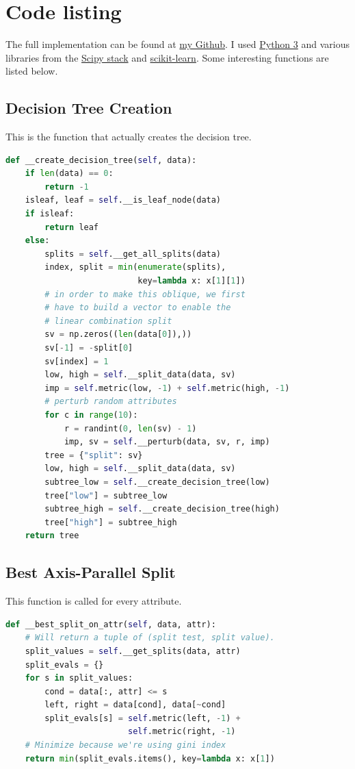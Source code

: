 \documentclass[12pt]{article}
\begin{document}
\appendix
\section{Code listing} \label{app:code}
The full implementation can be found at \href{http://github.com/KDercksen/pyblique}{my Github}. I used \href{http://www.python.org}{Python 3} and various libraries from the \href{http://www.scipy.org}{Scipy stack} and \href{http://www.scikit-learn.org}{scikit-learn}. Some interesting functions are listed below.

\subsection{Decision Tree Creation}
This is the function that actually creates the decision tree.
\begin{lstlisting}[language=Python]
def __create_decision_tree(self, data):
    if len(data) == 0:
        return -1
    isleaf, leaf = self.__is_leaf_node(data)
    if isleaf:
        return leaf
    else:
        splits = self.__get_all_splits(data)
        index, split = min(enumerate(splits), 
                           key=lambda x: x[1][1])
        # in order to make this oblique, we first 
        # have to build a vector to enable the
        # linear combination split
        sv = np.zeros((len(data[0]),))
        sv[-1] = -split[0]
        sv[index] = 1
        low, high = self.__split_data(data, sv)
        imp = self.metric(low, -1) + self.metric(high, -1)
        # perturb random attributes
        for c in range(10):
            r = randint(0, len(sv) - 1)
            imp, sv = self.__perturb(data, sv, r, imp)
        tree = {"split": sv}
        low, high = self.__split_data(data, sv)
        subtree_low = self.__create_decision_tree(low)
        tree["low"] = subtree_low
        subtree_high = self.__create_decision_tree(high)
        tree["high"] = subtree_high
    return tree
\end{lstlisting}

\subsection{Best Axis-Parallel Split}
This function is called for every attribute.
\begin{lstlisting}[language=Python]
def __best_split_on_attr(self, data, attr):
    # Will return a tuple of (split test, split value).
    split_values = self.__get_splits(data, attr)
    split_evals = {}
    for s in split_values:
        cond = data[:, attr] <= s
        left, right = data[cond], data[~cond]
        split_evals[s] = self.metric(left, -1) + 
                         self.metric(right, -1)
    # Minimize because we're using gini index
    return min(split_evals.items(), key=lambda x: x[1])
\end{lstlisting}
\end{document}
